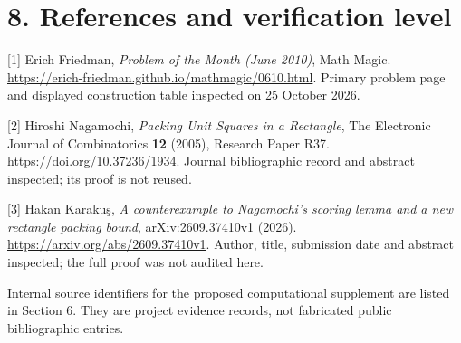 \documentclass[
  11pt,
  a4paper,
]{article}
\begin{document}
\section{8. References and verification
level}\label{references-and-verification-level}

{[}1{]} Erich Friedman, \emph{Problem of the Month (June 2010)}, Math
Magic. \url{https://erich-friedman.github.io/mathmagic/0610.html}.
Primary problem page and displayed construction table inspected on 25
October 2026.

{[}2{]} Hiroshi Nagamochi, \emph{Packing Unit Squares in a Rectangle},
The Electronic Journal of Combinatorics \textbf{12} (2005), Research
Paper R37. \url{https://doi.org/10.37236/1934}. Journal bibliographic
record and abstract inspected; its proof is not reused.

{[}3{]} Hakan Karakuş, \emph{A counterexample to Nagamochi's scoring
lemma and a new rectangle packing bound}, arXiv:2609.37410v1 (2026).
\url{https://arxiv.org/abs/2609.37410v1}. Author, title, submission date
and abstract inspected; the full proof was not audited here.

Internal source identifiers for the proposed computational supplement
are listed in Section 6. They are project evidence records, not
fabricated public bibliographic entries.
\end{document}
